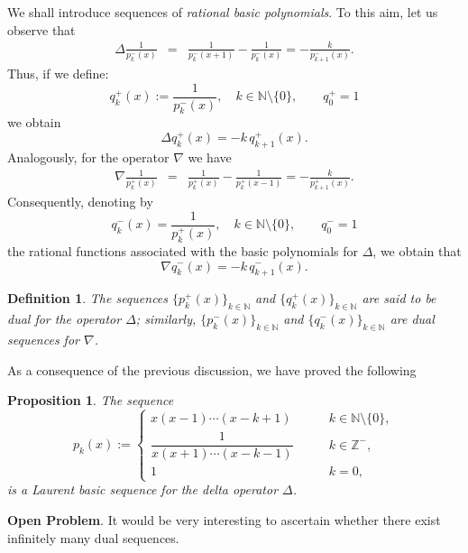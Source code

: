 \documentclass[10pt]{amsart}
\numberwithin{equation}{section}
\newtheorem{definition}{Definition}
\newtheorem{proposition}{Proposition}
\theoremstyle{definition}
\begin{document}
We shall introduce sequences of \textit{rational basic polynomials}. To
this aim, let us observe that
\begin{eqnarray*}
\Delta \frac{1}{p^{-}_{k}(x)}&=&\frac{1}{p^{-}_{k}(x+1)}-
\frac{1}{p^{-}_{k}(x)} =-\frac{k}{p^{-}_{k+1}(x)}.
\end{eqnarray*}
Thus, if we define:
\begin{equation}
q^{+}_{k}(x):=\frac{1}{p^{-}_{k}(x)}, \quad k\in \mathbb{N}\setminus\{0\},
\qquad q^{+}_{0}=1
\label{eq3.3}
\end{equation}
we obtain
\begin{equation}
\Delta q^{+}_{k}(x)=-k\,q^{+}_{k+1}(x).
\label{eq3.4}
\end{equation}
Analogously, for the operator $\nabla $ we have
\begin{eqnarray*}
\nabla \frac{1}{p^{+}_{k}(x)}&=&\frac{1}{p^{+}_{k}(x)}-
\frac{1}{p^{+}_{k}(x-1)}=-\frac{k}{p^{+}_{k+1}(x)}.
\end{eqnarray*}
Consequently, denoting by
\begin{equation}
q^{-}_{k}(x)=\frac{1}{p^{+}_{k}(x)}, \quad k\in \mathbb{N}\setminus
\{0\}, \qquad q^{-}_{0}=1
\label{eq3.5}
\end{equation}
the rational functions associated with the basic polynomials for
$\Delta $, we obtain that
\begin{equation}
\nabla q^{-}_{k}(x)=-k\,q^{-}_{k+1}(x).
\label{eq3.6}
\end{equation}

\begin{definition}
\label{defn4}
The sequences $\{p^{+}_{k}(x)\}_{k\in \mathbb{N}}$ and
$\{q^{+}_{k}(x)\}_{k\in \mathbb{N}}$ are said to be dual for the operator
$\Delta $; similarly, $\{p^{-}_{k}(x)\}_{k\in \mathbb{N}}$ and
$\{q^{-}_{k}(x)\}_{k\in \mathbb{N}}$ are dual sequences for
$\nabla $.
\end{definition}
 As a consequence of the previous discussion, we have proved the following
\begin{proposition}
\label{prop1}
The sequence
\begin{equation}
\label{eq:LSDelta}
p_{k}(x):=
\begin{cases}
x(x-1)\cdots (x-k+1) &\qquad k\in \mathbb{N}\setminus \{0\},
\\
\dfrac{1}{x(x+1)\cdots (x-k-1)} &\qquad k \in \mathbb{Z}^{-},
\\
1 &\qquad k=0,
\end{cases}
\end{equation}
is a Laurent basic sequence for the delta operator $\Delta $.
\end{proposition}
\textbf{Open Problem}. It would be very interesting to ascertain whether
there exist infinitely many dual sequences.
\end{document}
